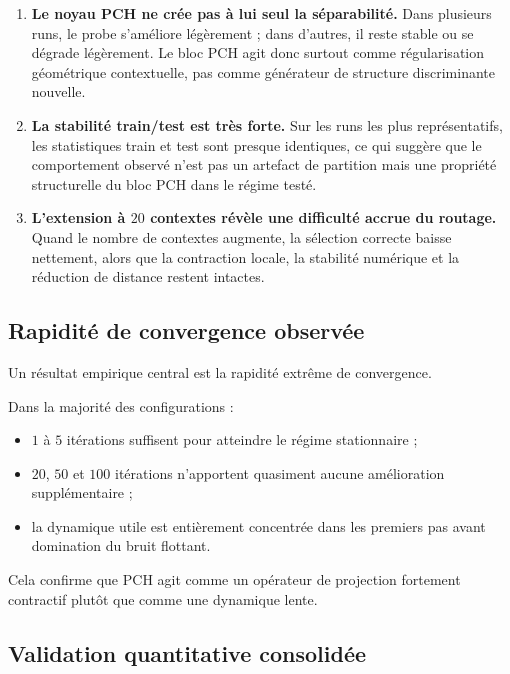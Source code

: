 \documentclass[11pt,a4paper]{article}
\newcommand{\1}{\mathbf 1}
\begin{document}
\begin{enumerate}[leftmargin=2em]
    \item \textbf{Le noyau PCH ne crée pas à lui seul la séparabilité.}
    Dans plusieurs runs, le probe s’améliore légèrement ; dans d’autres, il reste stable ou se dégrade légèrement. Le bloc PCH agit donc surtout comme régularisation géométrique contextuelle, pas comme générateur de structure discriminante nouvelle.

    \item \textbf{La stabilité train/test est très forte.}
    Sur les runs les plus représentatifs, les statistiques train et test sont presque identiques, ce qui suggère que le comportement observé n’est pas un artefact de partition mais une propriété structurelle du bloc PCH dans le régime testé.

    \item \textbf{L’extension à \(20\) contextes révèle une difficulté accrue du routage.}
    Quand le nombre de contextes augmente, la sélection correcte baisse nettement, alors que la contraction locale, la stabilité numérique et la réduction de distance restent intactes.
\end{enumerate}

\subsection{Rapidité de convergence observée}

Un résultat empirique central est la rapidité extrême de convergence.

Dans la majorité des configurations :

\begin{itemize}[leftmargin=2em]
\item \(1\) à \(5\) itérations suffisent pour atteindre le régime stationnaire ;
\item \(20\), \(50\) et \(100\) itérations n’apportent quasiment aucune amélioration supplémentaire ;
\item la dynamique utile est entièrement concentrée dans les premiers pas avant domination du bruit flottant.
\end{itemize}

Cela confirme que PCH agit comme un opérateur de projection fortement contractif plutôt que comme une dynamique lente.

\subsection{Validation quantitative consolidée}
\end{document}
